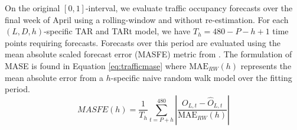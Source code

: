 On the original $[0,1]$-interval, we evaluate traffic occupancy forecasts over the final week of April using a rolling-window and without re-estimation. For each $(L,D,h)$-specific TAR and TARt model, we have $T_h=480-P-h+1$ time points requiring forecasts. Forecasts over this period are evaluated using the mean absolute scaled forecast error (MASFE) metric from \cite{Hyndman2006}. The formulation of MASE is found in Equation \ref{eq:trafficmase} where $\textrm{MAE}_{RW}(h)$ represents the mean absolute error from a $h$-specific naive random walk model over the fitting period. 
\begin{equation}
\label{eq:trafficmase}
  MASFE(h)=\frac{1}{T_h}\sum\limits_{t=P+h}^{480}\left|\frac{O_{L,t}-\widehat{O}_{L,t}}{\textrm{MAE}_{RW}(h)}\right|
\end{equation}

